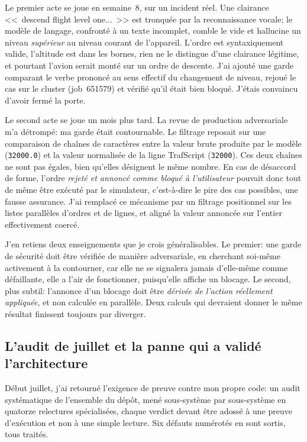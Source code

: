 \documentclass[11pt,a4paper]{article}
\begin{document}
Le premier acte se joue en semaine~8, sur un incident réel. Une clairance <<~descend flight level one...~>> est tronquée par la reconnaissance vocale; le modèle de langage, confronté à un texte incomplet, comble le vide et hallucine un niveau \emph{supérieur} au niveau courant de l'appareil. L'ordre est syntaxiquement valide, l'altitude est dans les bornes, rien ne le distingue d'une clairance légitime, et pourtant l'avion serait monté sur un ordre de descente. J'ai ajouté une garde comparant le verbe prononcé au sens effectif du changement de niveau, rejoué le cas sur le cluster (job~651579) et vérifié qu'il était bien bloqué. J'étais convaincu d'avoir fermé la porte. 

Le second acte se joue un mois plus tard. La revue de production adversariale m'a détrompé: ma garde était contournable. Le filtrage reposait sur une comparaison de chaînes de caractères entre la valeur brute produite par le modèle (\texttt{32000.0}) et la valeur normalisée de la ligne TrafScript (\texttt{32000}). Ces deux chaînes ne sont pas égales, bien qu'elles désignent le même nombre. En cas de désaccord de forme, l'ordre \emph{rejeté et annoncé comme bloqué à l'utilisateur} pouvait donc tout de même être exécuté par le simulateur, c'est-à-dire le pire des cas possibles, une fausse assurance. J'ai remplacé ce mécanisme par un filtrage positionnel sur les listes parallèles d'ordres et de lignes, et aligné la valeur annoncée sur l'entier effectivement coercé. 

J'en retiens deux enseignements que je crois généralisables. Le premier: une garde de sécurité doit être vérifiée de manière adversariale, en cherchant soi-même activement à la contourner, car elle ne se signalera jamais d'elle-même comme défaillante, elle a l'air de fonctionner, puisqu'elle affiche un blocage. Le second, plus subtil: l'annonce d'un blocage doit être \emph{dérivée de l'action réellement appliquée}, et non calculée en parallèle. Deux calculs qui devraient donner le même résultat finissent toujours par diverger. 

\subsection{L'audit de juillet et la panne qui a validé l'architecture}
\label{sec:audit}

Début juillet, j'ai retourné l'exigence de preuve contre mon propre code: un audit systématique de l'ensemble du dépôt, mené sous-système par sous-système en quatorze relectures spécialisées, chaque verdict devant être adossé à une preuve d'exécution et non à une simple lecture. Six défauts numérotés en sont sortis, tous traités.
\end{document}
